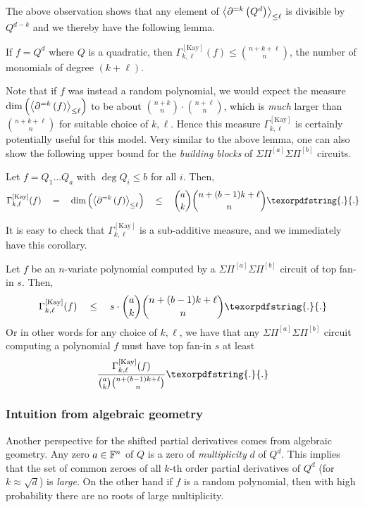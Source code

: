 \documentclass{birkjour}
\newcommand{\CM}[1]{\Gamma^{\mathrm{[#1]}}}
\newcommand{\spaced}[1]{\quad#1\quad}
\newcommand{\SPD}[3]{\inangle{\partial^{=#1}\inparen{#3}}_{\leq #2}}
\newcommand{\mySPSP}[2]{\Sigma\Pi^{[#1]}\Sigma\Pi^{[#2]}}
\providecommand{\DIFaddtex}[1]{{\protect\color{blue}\uwave{#1}}} %
\providecommand{\DIFaddbegin}{} %
\providecommand{\DIFaddend}{} %
\providecommand{\DIFadd}[1]{\texorpdfstring{\DIFaddtex{#1}}{#1}} %
\begin{document}
The above observation shows that any element of $\SPD{k}{\ell}{Q^d}$ is divisible by $Q^{d-k}$ and we thereby have the following lemma. 

\begin{lemma}
  If $f = Q^d$ where $Q$ is a quadratic, then $\CM{Kay}_{k,\ell}(f)\leq \binom{n + k + \ell}{n}$, the number of monomials of degree $(k + \ell)$. 
\end{lemma}

Note that if $f$ was instead a random polynomial, we would expect the measure  $\dim \inparen{\SPD{k}{\ell}{f}}$ to be about $\binom{n+k}{n} \cdot \binom{n+\ell}{n}$, which is \emph{much} larger than $\binom{n+k+\ell}{n}$ for suitable choice of $k,\ell$. Hence this measure $\CM{Kay}_{k,\ell}$ is certainly potentially useful for this model. Very similar to the above lemma, one can also show the following upper bound for the \emph{building blocks} of $\mySPSP{a}{b}$ circuits. 

\begin{lemma}
Let $f = Q_1\dots Q_a$ with $\deg Q_i \leq b$ for all $i$. Then, 
$$
\CM{Kay}_{k,\ell}(f) \spaced{=} \dim \inparen{\SPD{k}{\ell}{f}} \spaced{\leq} \binom{a}{k}\binom{n + (b-1)k + \ell}{n}\DIFaddbegin \DIFadd{.
}\DIFaddend $$
\end{lemma}

It is easy to check that $\CM{Kay}_{k,\ell}$ is a sub-additive measure, and we immediately have this corollary. 

\begin{corollary}\label{cor:dimSPD-upper-bound}
Let $f$ be an $n$-variate polynomial computed by a $\mySPSP{a}{b}$ circuit of top fan-in $s$. Then,
$$
\CM{Kay}_{k,\ell}(f) \spaced{\leq} s\cdot \binom{a}{k}\binom{n + (b-1)k + \ell}{n}\DIFaddbegin \DIFadd{.
}\DIFaddend $$
Or in other words for any choice of $k,\ell$, we have that any $\mySPSP{a}{b}$ circuit computing a polynomial $f$ must have top fan-in $s$ at least
$$\frac{\CM{Kay}_{k,\ell}(f)}{\binom{a}{k}\binom{n+(b-1)k + \ell}{n}}\DIFaddbegin\DIFadd{.}\DIFaddend$$
\end{corollary}



\subsubsection*{Intuition from algebraic geometry}

Another perspective for the shifted partial derivatives comes from algebraic geometry. Any zero $a\in \mathbb{F}^n$ of $Q$ is a zero of \emph{multiplicity} $d$ of $Q^d$. This implies that the set of common zeroes of all $k$-th order partial derivatives of $Q^d$ (for $k \approx  \sqrt{d}$) is \emph{large}. On the other hand if $f$ is a random polynomial, then with high probability there are no roots of large multiplicity. 
\end{document}
